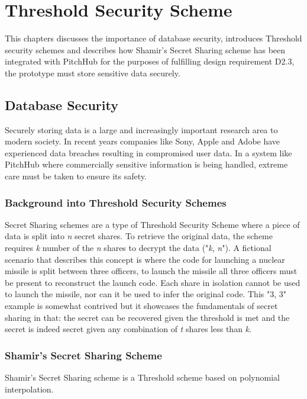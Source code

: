 \chapter{Threshold Security Scheme}\label{C:threshholdSecurity}
This chapters discusses the importance of database security, introduces Threshold security schemes and describes how Shamir's Secret Sharing scheme has been integrated with PitchHub for the purposes of fulfilling design requirement D2.3, the prototype must store sensitive data securely.

\section{Database Security}\label{S:databaseSecurity}
Securely storing data is a large and increasingly important research area to modern society. In recent years companies like Sony, Apple and Adobe have experienced data breaches resulting in compromised user data. In a system like PitchHub where commercially sensitive information is being handled, extreme care must be taken to ensure its safety. 

\subsection{Background into Threshold Security Schemes}
Secret Sharing schemes are a type of Threshold Security Scheme where a piece of data is split into \textit{n} secret shares. To retrieve the original data, the scheme requires \textit{k} number of the \textit{n} shares to decrypt the data ("\textit{k}, \textit{n}"). A fictional scenario that describes this concept is where the code for launching a nuclear missile is split between three officers, to launch the missile all three officers must be present to reconstruct the launch code. Each share in isolation cannot be used to launch the missile, nor can it be used to infer the original code. This "3, 3" example is somewhat contrived but it showcases the fundamentals of secret sharing in that: the secret can be recovered given the threshold is met and the secret is indeed secret given any combination of \textit{t} shares less than \textit{k}.

\subsection{Shamir's Secret Sharing Scheme}
Shamir's Secret Sharing scheme \cite{shamir1979share} is a Threshold scheme based on polynomial interpolation. 

